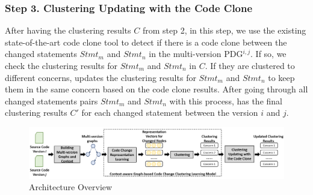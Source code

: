\subsubsection{Step 3. Clustering Updating with the Code Clone}

After having the clustering results $C$ from step 2, in this step, we use the existing state-of-the-art code clone tool \cite{} to detect if there is a code clone between the changed statements $Stmt_m$ and $Stmt_n$ in the multi-version PDG$^{i,j}$. If so, we check the clustering results for $Stmt_m$ and $Stmt_n$ in $C$. If they are clustered to different concerns, \tool updates the clustering results for $Stmt_m$ and $Stmt_n$ to keep them in the same concern based on the code clone results. After going through all changed statements pairs $Stmt_m$ and $Stmt_n$ with this process, \tool has the final clustering results $C'$ for each changed statement between the version $i$ and $j$.

\begin{figure}[t]
	\centering
 	\includegraphics[width=6.5in]{figures/overview.png}
	\vspace{-6pt}
	\caption{Architecture Overview}
	\label{fig:overview}
\end{figure}
